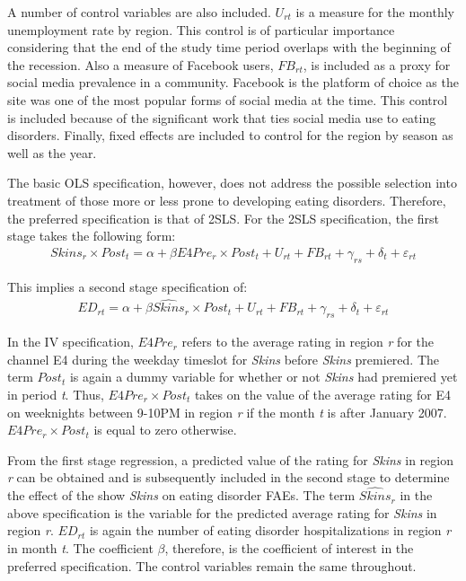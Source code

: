 \documentclass[12pt]{article}
\begin{document}
A number of control variables are also included. $U_{rt}$ is a measure for the monthly unemployment rate by region. This control is of particular importance considering that the end of the study time period overlaps with the beginning of the recession. Also a measure of Facebook users, $FB_{rt}$, is included as a proxy for social media prevalence in a community. Facebook is the platform of choice as the site was one of the most popular forms of social media at the time. This control is included because of the significant work that ties social media use to eating disorders. Finally, fixed effects are included to control for the region by season as well as the year. 

The basic OLS specification, however, does not address the possible selection into treatment of those more or less prone to developing eating disorders. Therefore, the preferred specification is that of 2SLS. For the 2SLS specification, the first stage takes the following form:
\begin{eqnarray*}	
	Skins_{r} \times Post_t = \alpha + \beta E4Pre_{r} \times Post_{t} + U_{rt} + FB_{rt} + \gamma_{rs} + \delta_t + \varepsilon_{rt}	
\end{eqnarray*}

This implies a second stage specification of:
\begin{eqnarray*}	
	ED_{rt} = \alpha + \beta \widehat{Skins}_{r} \times Post_{t} + U_{rt} + FB_{rt} + \gamma_{rs} + \delta_t + \varepsilon_{rt}	
\end{eqnarray*}

In the IV specification, $E4Pre_{r}$ refers to the average rating in region \textit{r} for the channel E4 during the weekday timeslot for \textit{Skins}  before \textit{Skins} premiered. The term $Post_t$ is again a dummy variable for whether or not \textit{Skins} had premiered yet in period \textit{t}. Thus, $E4Pre_{r} \times Post_{t}$ takes on the value of the average rating for E4 on weeknights between 9-10PM in region \textit{r} if the month \textit{t} is after January 2007. $E4Pre_{r} \times Post_{t}$ is equal to zero otherwise.

From the first stage regression, a predicted value of the rating for \textit{Skins} in region \textit{r} can be obtained and is subsequently included in the second stage to determine the effect of the show \textit{Skins} on eating disorder FAEs. The term $\widehat{Skins}_{r}$ in the above specification is the variable for the predicted average rating for \textit{Skins} in region \textit{r}. $ED_{rt}$ is again the number of eating disorder hospitalizations in region \textit{r} in month \textit{t}. The coefficient $\beta$, therefore, is the coefficient of interest in the preferred specification. The control variables remain the same throughout.
\end{document}
